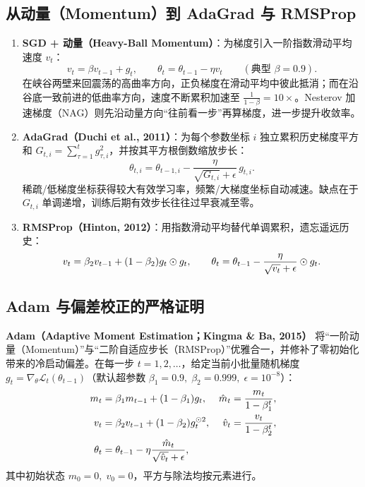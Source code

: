 \subsection{从动量（Momentum）到 AdaGrad 与 RMSProp}

\begin{enumerate}
  \item \textbf{SGD + 动量（Heavy-Ball Momentum）}：为梯度引入一阶指数滑动平均速度 $v_t$：
  \[
    v_t = \beta v_{t-1} + g_t, \qquad \theta_t = \theta_{t-1} - \eta v_t \qquad (\text{典型 }\beta = 0.9).
  \]
  在峡谷两壁来回震荡的高曲率方向，正负梯度在滑动平均中彼此抵消；而在沿谷底一致前进的低曲率方向，速度不断累积加速至 $\frac{1}{1-\beta} = 10\times$。Nesterov 加速梯度（NAG）则先沿动量方向“往前看一步”再算梯度，进一步提升收敛率。

  \item \textbf{AdaGrad（Duchi et al., 2011）}：为每个参数坐标 $i$ 独立累积历史梯度平方和 $G_{t,i} = \sum_{\tau=1}^{t} g_{\tau,i}^2$，并按其平方根倒数缩放步长：
  \[
    \theta_{t,i} = \theta_{t-1,i} - \frac{\eta}{\sqrt{G_{t,i}} + \epsilon}\, g_{t,i}.
  \]
  稀疏/低梯度坐标获得较大有效学习率，频繁/大梯度坐标自动减速。缺点在于 $G_{t,i}$ 单调递增，训练后期有效步长往往过早衰减至零。

  \item \textbf{RMSProp（Hinton, 2012）}：用指数滑动平均替代单调累积，遗忘遥远历史：
  \[
    v_t = \beta_2 v_{t-1} + (1-\beta_2) g_t \odot g_t, \qquad \theta_t = \theta_{t-1} - \frac{\eta}{\sqrt{v_t} + \epsilon} \odot g_t.
  \]
\end{enumerate}

\subsection{Adam 与偏差校正的严格证明}

\textbf{Adam（Adaptive Moment Estimation；Kingma \& Ba, 2015）} 将“一阶动量（Momentum）”与“二阶自适应步长（RMSProp）”优雅合一，并修补了零初始化带来的冷启动偏差。在每一步 $t = 1, 2, \dots$，给定当前小批量随机梯度 $g_t = \nabla_\theta \mathcal{L}_t(\theta_{t-1})$（默认超参数 $\beta_1 = 0.9,\; \beta_2 = 0.999,\; \epsilon = 10^{-8}$）：
\begin{align}
  m_t &= \beta_1 m_{t-1} + (1 - \beta_1) g_t, & \hat{m}_t &= \frac{m_t}{1 - \beta_1^t}, \label{eq:adam-m} \\
  v_t &= \beta_2 v_{t-1} + (1 - \beta_2) g_t^{\odot 2}, & \hat{v}_t &= \frac{v_t}{1 - \beta_2^t}, \label{eq:adam-v} \\
  \theta_t &= \theta_{t-1} - \eta \frac{\hat{m}_t}{\sqrt{\hat{v}_t} + \epsilon}, \label{eq:adam-step}
\end{align}
其中初始状态 $m_0 = 0,\; v_0 = 0$，平方与除法均按元素进行。

